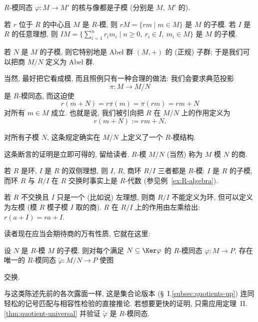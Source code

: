 \begin{example}
\label{ex:kernel-image-mod}
$R$-模同态 $\varphi : M \to M'$ 的核与像都是子模 (分别是 $M$, $M'$ 的).
\end{example}

\begin{example}
\label{ex:rM}
若 $r$ 位于 $R$ 的中心且 $M$ 是 $R$-模, 则 $rM = \{rm \mid m \in M\}$ 是 $M$ 的子模. 若 $I$ 是 $R$ 的任意理想, 则 $IM = \{\sum_{i=1}^{n}r_i m_i \mid n\geq0,\ r_i\in I,\ m_i\in M\}$ 是 $M$ 的子模.
\end{example}

若 $N$ 是 $M$ 的子模, 则它特别地是 Abel 群 $(M, +)$ 的 (正规) 子群; 于是我们可以把商 $M/N$ 定义为 Abel 群.

当然, 最好把它看成模, 而且照例只有一种合理的做法: 我们会要求典范投影
\[
\pi : M \to M/N
\]
是 $R$-模同态, 而这迫使
\[
r(m + N) = r\pi(m) = \pi(rm) = rm + N
\]
对所有 $m \in M$ 成立. 也就是说, 我们被引向把 $R$ 在 $M/N$ 上的作用定义为
\[
r(m + N) := rm + N.
\]

\begin{claim}
\label{claim:quotient-module}
对所有子模 $N$, 这条规定确实在 $M/N$ 上定义了一个 $R$-模结构.
\end{claim}

这条断言的证明是立即可得的, 留给读者. $R$-模 $M/N$ (当然) 称为 $M$ 模 $N$ 的商.

\begin{example}
\label{ex:ideal-module}
若 $R$ 是环, $I$ 是 $R$ 的双侧理想, 则 $I$, $R$, 商环 $R/I$ 三者都是 $R$-模: $I$ 是 $R$ 的子模, 而环 $R$ 与 $R/I$ 在 $R$ 交换时事实上是 $R$-代数 (参见例~\ref{ex:R-algebra}).
\end{example}

\begin{example}
\label{ex:left-ideal-quotient}
若 $R$ 不交换且 $I$ 只是一个 (比如说) 左理想, 则商 $R/I$ 不能定义为环, 但可以定义为左模 (模 $R$ 模子模 $I$ 取的商). $R$ 在 $R/I$ 上的作用由左乘给出: $r(a + I) = ra + I$.
\end{example}

读者现在应当会期待商的万有性质, 它就在这里:

\begin{theorem}
\label{thm:quotient-module}
设 $N$ 是 $R$-模 $M$ 的子模. 则对每个满足 $N \subseteq \Ker \varphi$ 的 $R$-模同态 $\varphi : M \to P$, 存在唯一的 $R$-模同态 $\tilde{\varphi} : M/N \to P$ 使图
\begin{center}
\end{center}
交换.

与这类陈述先前的各次露面一样, 这是集合论版本 (\S~I.\ref{subsec:quotients-up}) 连同轻松的记号匹配与相容性检验的直接推论. 若想要更快的证明, 只需应用定理~II.\ref{thm:quotient-universal} 并验证 $\tilde{\varphi}$ 是 $R$-模同态.
\end{theorem}

